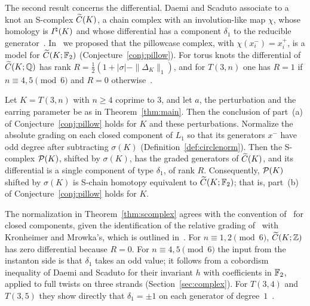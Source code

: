 The second result concerns the differential. Daemi and Scaduto associate to a knot an S-complex
$\widetilde C(K)$, a chain complex with an involution-like map $\chi$, whose homology is $I^{\natural}(K)$ and whose
differential has a component $\delta_1$ to the reducible generator~\cite{DSEquiv}. In~\cite{W26} we proposed
that the pillowcase complex, with $\chi(x_i^-)=x_i^+$, is a model for $\widetilde C(K;\mathbb{F}_2)$ (Conjecture~\ref{conj:pillow}).
For torus knots the differential of $\widetilde C(K;\mathbb{Q})$ has rank $R=\frac12(1+|\sigma|-\|\Delta_K\|_1)$, and for
$T(3,n)$ one has $R=1$ if $n\equiv4,5\pmod6$ and $R=0$ otherwise~\cite{W26}.

\begin{theorem}\label{thm:scomplex}
Let $K=T(3,n)$ with $n\ge4$ coprime to $3$, and let $a$, the perturbation and the earring parameter be as in
Theorem~\ref{thm:main}. Then the conclusion of part~(a) of Conjecture~\ref{conj:pillow} holds for $K$ and these
perturbations. Normalize
the absolute grading on each closed component of $L_1$ so that its generators $x^-$ have odd degree after
subtracting $\sigma(K)$ (Definition~\ref{def:circlenorm}). Then the S-complex $\mathcal{P}(K)$, shifted by $\sigma(K)$, has
the graded generators of $\widetilde C(K)$, and its differential is a single component of type $\delta_1$, of rank $R$.
Consequently, $\mathcal{P}(K)$ shifted by $\sigma(K)$ is S-chain homotopy equivalent to $\widetilde C(K;\mathbb{F}_2)$; that is, part~(b) of
Conjecture~\ref{conj:pillow} holds for $K$.
\end{theorem}

The normalization in Theorem~\ref{thm:scomplex} agrees with the convention of~\cite[\S6.1]{HHK2} for closed
components, given the identification of the relative grading of~\cite{HHK2} with Kronheimer and Mrowka's,
which is outlined in~\cite[\S6.1]{HHK2}. For $n\equiv1,2\pmod6$, $\widetilde C(K;\mathbb{Z})$ has zero differential because $R=0$. For $n\equiv4,5\pmod6$ the input from the
instanton side is that $\delta_1$ takes an odd value; it follows from a cobordism inequality of Daemi and Scaduto
for their invariant $h$ with coefficients in $\mathbb{F}_2$, applied to full twists on three strands (Section~\ref{sec:complex}).
For $T(3,4)$ and $T(3,5)$ they show directly that $\delta_1=\pm1$ on each generator of degree~$1$~\cite[\S\S9.3--9.4]{DSEquiv}.

